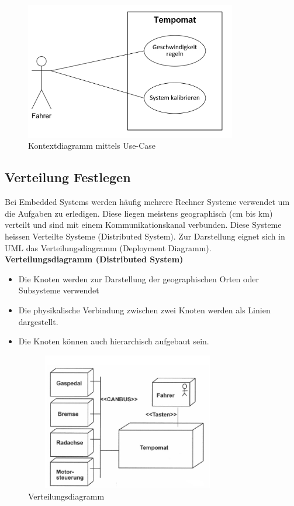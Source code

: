 \begin{figure}[h]
	\centering
	\includegraphics[height=6cm]{images/Modellierung/Systemgrenze}
	\caption{Kontextdiagramm mittels Use-Case}
\end{figure}

\subsection{Verteilung Festlegen }
Bei Embedded Systems werden häufig mehrere Rechner Systeme verwendet um die Aufgaben zu erledigen. Diese liegen meistens 
geographisch (cm bis km) verteilt und sind mit einem Kommunikationskanal verbunden. Diese Systeme heissen Verteilte Systeme 
(Distributed System). Zur Darstellung eignet sich in UML das Verteilungsdiagramm (Deployment Diagramm).\\

\textbf{Verteilungsdiagramm (Distributed System)}
\begin{itemize}
	\item Die Knoten werden zur Darstellung der geographischen Orten oder Subsysteme verwendet
	\item Die physikalische Verbindung zwischen zwei Knoten werden als Linien dargestellt.
	\item Die Knoten können auch hierarchisch aufgebaut sein.
\end{itemize}

\begin{figure}[h]
	\centering
	\includegraphics[height=6cm, width = 9cm,]{images/Modellierung/Verteilungsdiagramm}
	\caption{Verteilungsdiagramm}
\end{figure}

